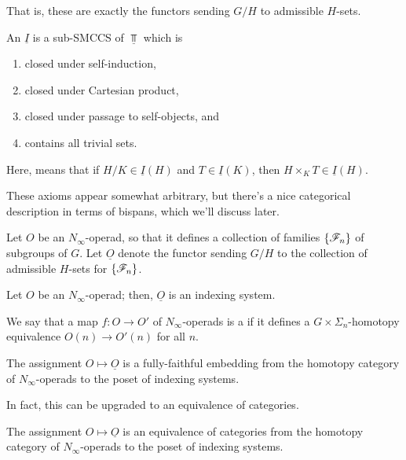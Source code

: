 That is, these are exactly the functors sending $G/H$ to admissible $H$-sets.
\begin{defn}
An  $\underline I$ is a sub-SMCCS of $\underline\Top$ which
is
\begin{enumerate}
	\item closed under self-induction,
	\item closed under Cartesian product,
	\item closed under passage to self-objects, and
	\item contains all trivial sets.
\end{enumerate}
Here,  means that if $H/K\in\underline I(H)$ and $T\in\underline I(K)$, then $H\times_K
T\in\underline I(H)$.
\end{defn}
These axioms appear somewhat arbitrary, but there's a nice categorical description in terms of bispans, which we'll
discuss later.
\begin{defn}
Let $O$ be an $N_\infty$-operad, so that it defines a collection of families $\{\mathscr F_n\}$ of subgroups of $G$.
Let $\underline O$ denote the functor sending $G/H$ to the collection of admissible $H$-sets for $\{\mathscr F_n\}$.
\end{defn}
\begin{prop}
\label{Ninfind}
Let $O$ be an $N_\infty$-operad; then, $\underline O$ is an indexing system.
\end{prop}
We say that a map $f\colon O\to O'$ of $N_\infty$-operads is a  if it defines a
$G\times\Sigma_n$-homotopy equivalence $O(n)\to O'(n)$ for all $n$.
\begin{thm}
The assignment $O\mapsto\underline O$ is a fully-faithful embedding from the homotopy category of
$N_\infty$-operads to the poset of indexing systems.
\end{thm}
In fact, this can be upgraded to an equivalence of categories.
\begin{thm}
The assignment $O\mapsto\underline O$ is an equivalence of categories from the homotopy category of
$N_\infty$-operads to the poset of indexing systems.
\end{thm}
